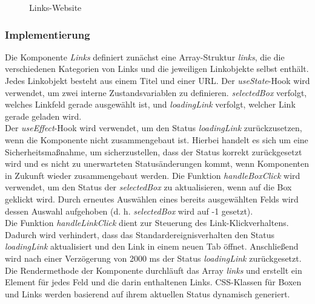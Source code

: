\begin{figure}[htbp]
	\centering
	\caption{Links-Website}
\end{figure}
\newpage
\subsubsection{Implementierung}
Die Komponente \emph{Links} definiert zunächst eine Array-Struktur \emph{links}, die die verschiedenen Kategorien von Links und die jeweiligen Linkobjekte selbst enthält. Jedes Linkobjekt besteht aus einem Titel und einer URL.  
Der \emph{useState}-Hook wird verwendet, um zwei interne Zustandsvariablen zu definieren. \emph{selectedBox} verfolgt, welches Linkfeld gerade ausgewählt ist, und \emph{loadingLink} verfolgt, welcher Link gerade geladen wird.\\  
Der \emph{useEffect}-Hook wird verwendet, um den Status \emph{loadingLink} zurückzusetzen, wenn die Komponente nicht zusammengebaut ist. Hierbei handelt es sich um eine Sicherheitsmaßnahme, um sicherzustellen, dass der Status korrekt zurückgesetzt wird und es nicht zu unerwarteten Statusänderungen kommt, wenn Komponenten in  Zukunft wieder zusammengebaut werden. Die Funktion \emph{handleBoxClick} wird verwendet, um den Status der \emph{selectedBox} zu aktualisieren, wenn auf die Box geklickt wird. Durch erneutes Auswählen eines bereits ausgewählten Felds wird dessen Auswahl aufgehoben (d. h. \emph{selectedBox} wird auf -1 gesetzt). \\
Die Funktion \emph{handleLinkClick} dient zur Steuerung des Link-Klickverhaltens. Dadurch wird verhindert, dass das Standardereignisverhalten den Status \emph{loadingLink} aktualisiert und den Link in einem neuen Tab öffnet. Anschließend wird nach einer Verzögerung von 2000 ms der Status \emph{loadingLink} zurückgesetzt.  Die Rendermethode der Komponente durchläuft das Array \emph{links} und erstellt ein Element für jedes Feld und die darin enthaltenen Links. CSS-Klassen für  Boxen und Links werden basierend auf ihrem aktuellen Status dynamisch generiert.\\
